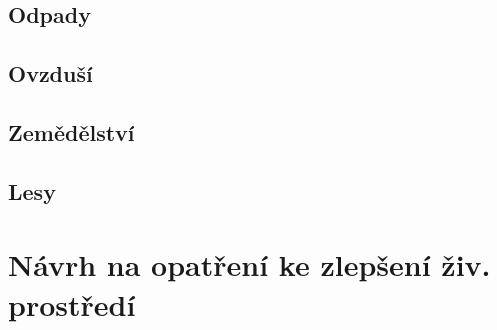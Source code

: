 \documentclass[12pt]{article} %
\begin{document}
\subsection{Odpady}
\subsection{Ovzduší}
\subsection{Zemědělství}
\subsection{Lesy}

\section{Návrh na opatření ke zlepšení živ. prostředí}
\end{document}
